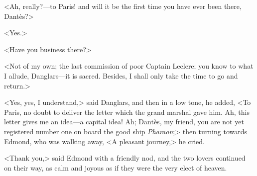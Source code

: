  <Ah, really?—to Paris! and will it be the first time you have ever been there, Dantès?> 

 <Yes.> 

 <Have you business there?> 

 <Not of my own; the last commission of poor Captain Leclere; you know to what I allude, Danglars—it is sacred. Besides, I shall only take the time to go and return.> 

 <Yes, yes, I understand,> said Danglars, and then in a low tone, he added, <To Paris, no doubt to deliver the letter which the grand marshal gave him. Ah, this letter gives me an idea—a capital idea! Ah; Dantès, my friend, you are not yet registered number one on board the good ship \textit{Pharaon};> then turning towards Edmond, who was walking away, <A pleasant journey,> he cried. 

 <Thank you,> said Edmond with a friendly nod, and the two lovers continued on their way, as calm and joyous as if they were the very elect of heaven. 